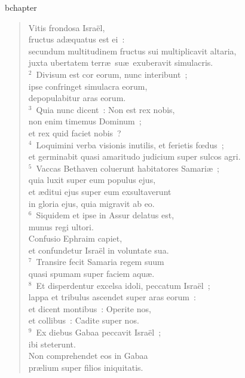 bchapter\begin{flushleft}\begin{verse}\vspace{-19pt}\hspace{6pt}Vitis frondosa Isra\"el,\\\hspace{6pt} fructus ad\ae quatus est ei~:\\ secundum multitudinem fructus sui multiplicavit altaria,\\ juxta ubertatem terr\ae\ su\ae\ exuberavit simulacris.\\
${}^{2}$~Divisum est cor eorum, nunc interibunt~;\\ ipse confringet simulacra eorum,\\ depopulabitur aras eorum.\\
${}^{3}$~Quia nunc dicent~: Non est rex nobis,\\ non enim timemus Dominum~;\\ et rex quid faciet nobis~?\\
${}^{4}$~Loquimini verba visionis inutilis, et ferietis fœdus~;\\ et germinabit quasi amaritudo judicium super sulcos agri.\\
${}^{5}$~Vaccas Bethaven coluerunt habitatores Samari\ae~;\\ quia luxit super eum populus ejus,\\ et \ae ditui ejus super eum exsultaverunt\\ in gloria ejus, quia migravit ab eo.\\
${}^{6}$~Siquidem et ipse in Assur delatus est,\\ munus regi ultori.\\ Confusio Ephraim capiet,\\ et confundetur Isra\"el in voluntate sua.\\
${}^{7}$~Transire fecit Samaria regem suum\\ quasi spumam super faciem aqu\ae .\\
${}^{8}$~Et disperdentur excelsa idoli, peccatum Isra\"el~;\\ lappa et tribulus ascendet super aras eorum~:\\ et dicent montibus~: Operite nos,\\ et collibus~: Cadite super nos.\\
${}^{9}$~Ex diebus Gabaa peccavit Isra\"el~;\\ ibi steterunt.\\ Non comprehendet eos in Gabaa\\ pr\ae lium super filios iniquitatis.\\

\end{verse}
\end{flushleft}
